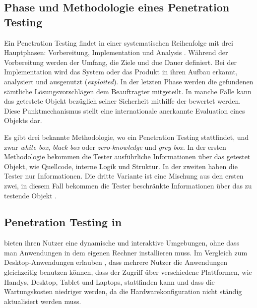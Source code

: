 \subsection{Phase und Methodologie eines Penetration Testing}

Ein Penetration Testing findet in einer systematischen Reihenfolge mit drei Hauptphasen: Vorbereitung, Implementation und Analysis \cite{Hessa_study_pentesting}. Während der Vorbereitung werden der Umfang, die Ziele und due Dauer definiert. Bei der Implementation wird das System oder das Produkt in ihren Aufbau erkannt, analysiert und ausgenutzt (\textit{exploited}). In der letzten Phase werden die gefundenen  sämtliche Lösungsvorschlägen dem Beauftragter mitgeteilt. In manche Fälle kann das getestete Objekt bezüglich seiner Sicherheit mithilfe der  bewertet werden. Diese Punktmechanismus stellt eine internationale anerkannte Evaluation eines Objekts dar. 

Es gibt drei bekannte Methodologie, wo ein Penetration Testing stattfindet, und zwar \textit{white box}, \textit{black box} oder \textit{zero-knowledge} und \textit{grey box}. In der ersten Methodologie bekommen die Tester ausführliche Informationen über das getestet Objekt, wie Quellcode, interne Logik und Struktur. In der zweiten haben die Tester nur  Informationen. Die dritte Variante ist eine Mischung aus den ersten zwei, in diesem Fall bekommen die Tester beschränkte Informationen über das zu testende Objekt \cite{Ehmer_methoden_testen}.




\subsection{Penetration Testing in }

 bieten ihren Nutzer eine dynamische und interaktive Umgebungen, ohne dass man Anwendungen in dem eigenen Rechner installieren muss. Im Vergleich zum Desktop-Anwendungen erlauben , dass mehrere Nutzer die Anwendungen gleichzeitig benutzen können, dass der Zugriff über verschiedene Plattformen, wie Handys, Desktop, Tablet und Laptops, stattfinden kann und dass die Wartungskosten niedriger werden, da die Hardwarekonfiguration nicht ständig aktualisiert werden muss\cite{webapp}. 

